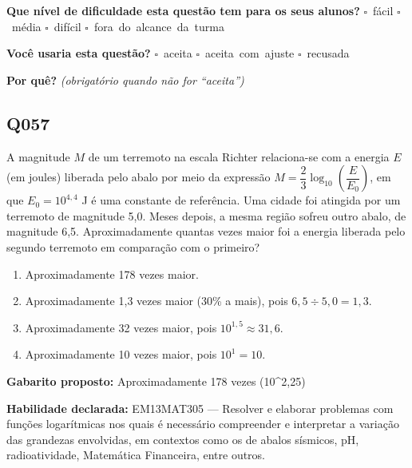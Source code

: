 \documentclass[11pt,a4paper]{article}
\begin{document}
\textbf{Que nível de dificuldade esta questão tem para os seus alunos?}\quad
\mbox{$\square$~fácil} \quad \mbox{$\square$~média} \quad
\mbox{$\square$~difícil} \quad \mbox{$\square$~fora do alcance da turma}

\textbf{Você usaria esta questão?}\quad
\mbox{$\square$~aceita} \quad \mbox{$\square$~aceita com ajuste} \quad
\mbox{$\square$~recusada}

\textbf{Por quê?} \emph{(obrigatório quando não for ``aceita'')}

\underline{\hspace{\linewidth}}

\underline{\hspace{\linewidth}}
\vspace{0.6em}

\begin{samepage}
\subsection*{Q057}
A magnitude $M$ de um terremoto na escala Richter relaciona-se com a energia $E$ (em joules) liberada pelo abalo por meio da expressão $M = \dfrac{2}{3}\log_{10}\left(\dfrac{E}{E_0}\right)$, em que $E_0 = 10^{4,4}$ J é uma constante de referência. Uma cidade foi atingida por um terremoto de magnitude 5,0. Meses depois, a mesma região sofreu outro abalo, de magnitude 6,5. Aproximadamente quantas vezes maior foi a energia liberada pelo segundo terremoto em comparação com o primeiro?
\begin{enumerate}[label=(\alph*),nosep,leftmargin=*]
\item Aproximadamente 178 vezes maior.
\item Aproximadamente 1,3 vezes maior (30\% a mais), pois $6{,}5 \div 5{,}0 = 1{,}3$.
\item Aproximadamente 32 vezes maior, pois $10^{1,5} \approx 31{,}6$.
\item Aproximadamente 10 vezes maior, pois $10^{1} = 10$.
\end{enumerate}

\textbf{Gabarito proposto:} Aproximadamente 178 vezes (10\textasciicircum{}2,25)

\textbf{Habilidade declarada:} EM13MAT305 --- Resolver e elaborar problemas com funções logarítmicas nos quais é necessário compreender e interpretar a variação das grandezas envolvidas, em contextos como os de abalos sísmicos, pH, radioatividade, Matemática Financeira, entre outros.
\end{samepage}
\end{document}

